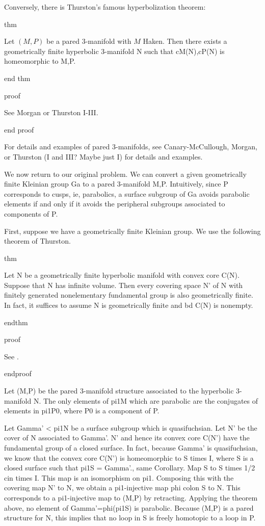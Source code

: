 Conversely, there is Thurston's famous hyperbolization theorem:

thm

Let $(M,P)$ be a pared 3-manifold with $M$ Haken. Then there exists
a geometrically finite hyperbolic 3-manifold N such that cM(N),cP(N) is
homeomorphic to M,P.

end thm

proof

See Morgan or Thurston I-III.

end proof

For details and examples of pared 3-manifolds, see Canary-McCullough, Morgan,
or Thurston (I and III? Maybe just I) for details and examples.

We now return to our original problem. We can convert a given geometrically
finite Kleinian group Ga to a pared 3-manifold M,P. Intuitively, since
P corresponds to cusps, ie, parabolics, a surface subgroup of Ga avoids
parabolic elements if and only if it avoids the peripheral subgroups associated
to components of P.

First, suppose we have a geometrically finite Kleinian group.  We use the
following theorem of Thurston.

thm

Let N be a geometrically finite hyperbolic manifold with convex core C(N).
Suppose that N has infinite volume. Then every covering space N' of N with
finitely generated nonelementary fundamental group is also geometrically
finite. In fact, it suffices to assume N is geometrically finite and bd C(N) is
nonempty.


endthm

proof

See \cite{Mo}. %

endproof


Let (M,P) be the pared 3-manifold structure associated to the hyperbolic
3-manifold N. The only elements of pi1M which are parabolic are the conjugates
of elements in pi1P0, where P0 is a component of P.

Let Gamma' < pi1N be a surface subgroup which is quasifuchsian. Let N' be the
cover of N associated to Gamma'. N' and hence its convex core C(N') have the
fundamental group of a closed surface. In fact, because Gamma' is
quasifuchsian, we know that the convex core C(N') is homeomorphic to S times I,
where S is a closed surface such that pi1S = Gamma'.\cite{Mo}, same Corollary.
Map S to S times 1/2 cin times I. This map is an isomorphism on pi1. Composing
this with the covering map N' to N, we obtain a pi1-injective map phi colon
S to N.  This corresponds to a pi1-injective map to (M,P) by retracting.
Applying the theorem above, no element of Gamma'=phi(pi1S) is parabolic.
Because (M,P) is a pared structure for N, this implies that no loop in S is
freely homotopic to a loop in P.

